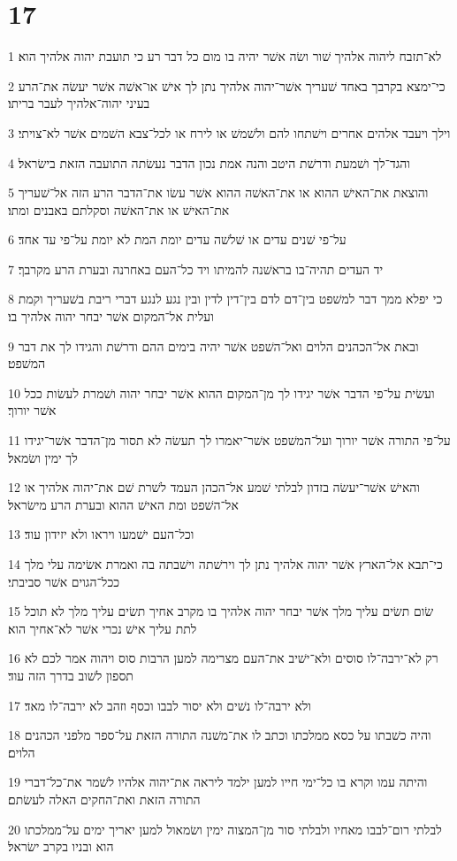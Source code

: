 \chapter{17}

\par 1 לא־תזבח ליהוה אלהיך שׁור ושׂה אשׁר יהיה בו מום כל דבר רע כי תועבת יהוה אלהיך הוא׃
\par 2 כי־ימצא בקרבך באחד שׁעריך אשׁר־יהוה אלהיך נתן לך אישׁ או־אשׁה אשׁר יעשׂה את־הרע בעיני יהוה־אלהיך לעבר בריתו׃
\par 3 וילך ויעבד אלהים אחרים וישׁתחו להם ולשׁמשׁ או לירח או לכל־צבא השׁמים אשׁר לא־צויתי׃
\par 4 והגד־לך ושׁמעת ודרשׁת היטב והנה אמת נכון הדבר נעשׂתה התועבה הזאת בישׂראל׃
\par 5 והוצאת את־האישׁ ההוא או את־האשׁה ההוא אשׁר עשׂו את־הדבר הרע הזה אל־שׁעריך את־האישׁ או את־האשׁה וסקלתם באבנים ומתו׃
\par 6 על־פי שׁנים עדים או שׁלשׁה עדים יומת המת לא יומת על־פי עד אחד׃
\par 7 יד העדים תהיה־בו בראשׁנה להמיתו ויד כל־העם באחרנה ובערת הרע מקרבך׃
\par 8 כי יפלא ממך דבר למשׁפט בין־דם לדם בין־דין לדין ובין נגע לנגע דברי ריבת בשׁעריך וקמת ועלית אל־המקום אשׁר יבחר יהוה אלהיך בו׃
\par 9 ובאת אל־הכהנים הלוים ואל־השׁפט אשׁר יהיה בימים ההם ודרשׁת והגידו לך את דבר המשׁפט׃
\par 10 ועשׂית על־פי הדבר אשׁר יגידו לך מן־המקום ההוא אשׁר יבחר יהוה ושׁמרת לעשׂות ככל אשׁר יורוך׃
\par 11 על־פי התורה אשׁר יורוך ועל־המשׁפט אשׁר־יאמרו לך תעשׂה לא תסור מן־הדבר אשׁר־יגידו לך ימין ושׂמאל׃
\par 12 והאישׁ אשׁר־יעשׂה בזדון לבלתי שׁמע אל־הכהן העמד לשׁרת שׁם את־יהוה אלהיך או אל־השׁפט ומת האישׁ ההוא ובערת הרע מישׂראל׃
\par 13 וכל־העם ישׁמעו ויראו ולא יזידון עוד׃
\par 14 כי־תבא אל־הארץ אשׁר יהוה אלהיך נתן לך וירשׁתה וישׁבתה בה ואמרת אשׂימה עלי מלך ככל־הגוים אשׁר סביבתי׃
\par 15 שׂום תשׂים עליך מלך אשׁר יבחר יהוה אלהיך בו מקרב אחיך תשׂים עליך מלך לא תוכל לתת עליך אישׁ נכרי אשׁר לא־אחיך הוא׃
\par 16 רק לא־ירבה־לו סוסים ולא־ישׁיב את־העם מצרימה למען הרבות סוס ויהוה אמר לכם לא תספון לשׁוב בדרך הזה עוד׃
\par 17 ולא ירבה־לו נשׁים ולא יסור לבבו וכסף וזהב לא ירבה־לו מאד׃
\par 18 והיה כשׁבתו על כסא ממלכתו וכתב לו את־משׁנה התורה הזאת על־ספר מלפני הכהנים הלוים׃
\par 19 והיתה עמו וקרא בו כל־ימי חייו למען ילמד ליראה את־יהוה אלהיו לשׁמר את־כל־דברי התורה הזאת ואת־החקים האלה לעשׂתם׃
\par 20 לבלתי רום־לבבו מאחיו ולבלתי סור מן־המצוה ימין ושׂמאול למען יאריך ימים על־ממלכתו הוא ובניו בקרב ישׂראל׃

